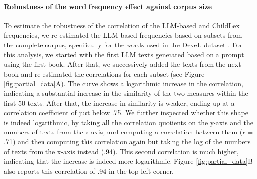 \documentclass[jou, a4paper]{apa7}
\begin{document}
\paragraph{Robustness of the word frequency effect against corpus size}

To estimate the robustness of the correlation of the LLM-based and ChildLex frequencies, we re-estimated the LLM-based frequencies based on subsets from the complete corpus, specifically for the words used in the DeveL dataset \citep{schroter_developmental_2017}. For this analysis, we started with the first LLM texts generated based on a prompt using the first book. After that, we successively added the texts from the next book and re-estimated the correlations for each subset (see Figure \ref{fig:partial_data}A). The curve shows a logarithmic increase in the correlation, indicating a substantial increase in the similarity of the two measures within the first 50 texts. After that, the increase in similarity is weaker, ending up at a correlation coefficient of just below .75. We further inspected whether this shape is indeed logarithmic, by taking all the correlation quotients on the y-axis and the numbers of texts from the x-axis, and computing a correlation between them (r = .71) and then computing this correlation again but taking the log of the numbers of texts from the x-axis instead (.94). This second correlation is much higher, indicating that the increase is indeed more logarithmic. Figure \ref{fig:partial_data}B also reports this correlation of .94 in the top left corner. 
\end{document}

